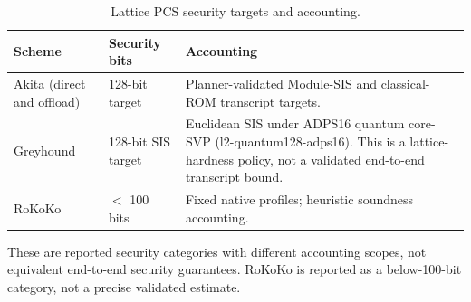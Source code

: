 \begin{table}[t]
\centering
\caption{Lattice PCS security targets and accounting.}
\begin{tabularx}{\linewidth}{@{}llX@{}}
\toprule
Scheme & Security bits & Accounting \\
\midrule
Akita (direct and offload) & 128-bit target & Planner-validated Module-SIS and classical-ROM transcript targets. \\
Greyhound & 128-bit SIS target & Euclidean SIS under ADPS16 quantum core-SVP (l2-quantum128-adps16). This is a lattice-hardness policy, not a validated end-to-end transcript bound. \\
RoKoKo & $<$ 100 bits & Fixed native profiles; heuristic soundness accounting. \\
\bottomrule
\end{tabularx}
\end{table}

These are reported security categories with different accounting scopes, not equivalent end-to-end security guarantees. RoKoKo is reported as a below-100-bit category, not a precise validated estimate.

